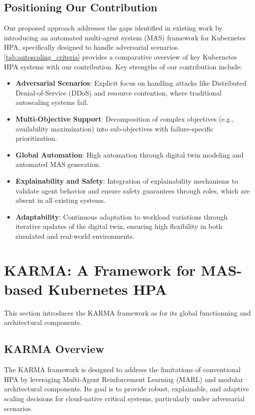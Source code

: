 \documentclass[conference]{IEEEtran}
\begin{document}
\subsection*{Positioning Our Contribution}
Our proposed approach addresses the gaps identified in existing work by introducing an automated multi-agent system (MAS) framework for Kubernetes HPA, specifically designed to handle adversarial scenarios. \autoref{tab:autoscaling_criteria} provides a comparative overview of key Kubernetes HPA systems with our contribution. Key strengths of our contribution include:
\begin{itemize}
    \item \textbf{Adversarial Scenarios}: Explicit focus on handling attacks like Distributed Denial-of-Service (DDoS) and resource contention, where traditional autoscaling systems fail.
    \item \textbf{Multi-Objective Support}: Decomposition of complex objectives (e.g., availability maximization) into sub-objectives with failure-specific prioritization.
    \item \textbf{Global Automation}: High automation through digital twin modeling and automated MAS generation.
    \item \textbf{Explainability and Safety}: Integration of explainability mechanisms to validate agent behavior and ensure safety guarantees through roles, which are absent in all existing systems.
    \item \textbf{Adaptability}: Continuous adaptation to workload variations through iterative updates of the digital twin, ensuring high flexibility in both simulated and real-world environments.
\end{itemize}


\section{KARMA: A Framework for MAS-based Kubernetes HPA}
\label{sec:proposed_approach}

This section introduces the KARMA framework as for its global functionning and architectural components.

\subsection{KARMA Overview}

The KARMA framework is designed to address the limitations of conventional HPA by leveraging Multi-Agent Reinforcement Learning (MARL) and modular architectural components. Its goal is to provide robust, explainable, and adaptive scaling decisions for cloud-native critical systems, particularly under adversarial scenarios.
\end{document}

